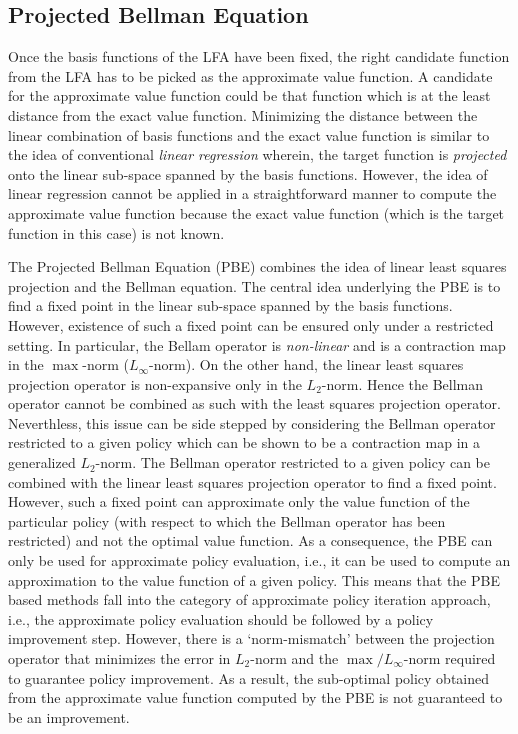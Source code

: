 \subsection{Projected Bellman Equation}
Once the basis functions of the LFA have been fixed, the right candidate function from the LFA has to be picked as the approximate value function. A candidate for the approximate value function could be that function which is at the least distance from the exact value function. Minimizing the distance between the linear combination of basis functions and the exact value function is similar to the idea of conventional \emph{linear regression} wherein, the target function is \emph{projected} onto the linear sub-space spanned by the basis functions. However, the idea of linear regression cannot be applied in a straightforward manner to compute the approximate value function because the exact value function (which is the target function in this case) is not known.\par
The Projected Bellman Equation (PBE) combines the idea of linear least squares projection and the Bellman equation. The central idea underlying the PBE is to find a fixed point in the linear sub-space spanned by the basis functions. However, existence of such a fixed point can be ensured only under a restricted setting. In particular, the Bellam operator is \emph{non-linear} and is a contraction map in the $\max$-norm ($L_\infty$-norm). On the other hand, the linear least squares projection operator is non-expansive only in the $L_2$-norm. Hence the Bellman operator cannot be combined as such with the least squares projection operator. Neverthless, this issue can be side stepped by considering the Bellman operator restricted to a given policy which can be shown to be a contraction map in a generalized $L_2$-norm. The Bellman operator restricted to a given policy can be combined with the linear least squares projection operator to find a fixed point. However, such a fixed point can approximate only the value function of the particular policy (with respect to which the Bellman operator has been restricted) and not the optimal value function. As a consequence, the PBE can only be used for approximate policy evaluation, i.e., it can be used to compute an approximation to the value function of a given policy. This means that the PBE based methods fall into the category of approximate policy iteration approach, i.e., the approximate policy evaluation should be followed by a policy improvement step. However, there is a `norm-mismatch' between the projection operator that minimizes the error in $L_2$-norm and the $\max/L_\infty$-norm required to guarantee policy improvement. As a result, the sub-optimal policy obtained from the approximate value function computed by the PBE is not guaranteed to be an improvement.\par
